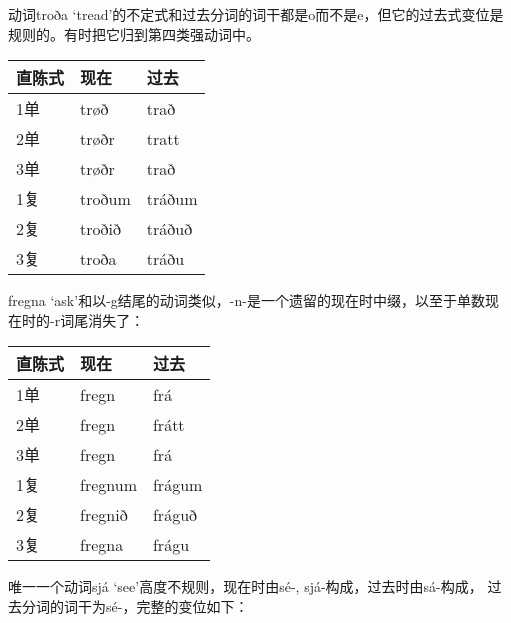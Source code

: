 动词troða
`tread‌'的不定式和过去分词的词干都是o而不是e，但它的过去式变位是规则的。有时把它归到第四类强动词中。

\begin{longtable}{lll}
  \toprule
  直陈式 & 现在   & 过去   \\
  \midrule
  \endhead
  \bottomrule
  \endfoot
  1单    & trøð   & trað   \\
  2单    & trøðr  & tratt  \\
  3单    & trøðr  & trað   \\
  1复    & troðum & tráðum \\
  2复    & troðið & tráðuð \\
  3复    & troða  & tráðu  \\
\end{longtable}

fregna
`ask'和以-g结尾的动词类似，-n-是一个遗留的现在时中缀，以至于单数现在时的-r词尾消失了：

\begin{longtable}{lll}
  \toprule
  直陈式 & 现在    & 过去   \\
  \midrule
  \endhead
  \bottomrule
  \endfoot
  1单    & fregn   & frá    \\
  2单    & fregn   & frátt  \\
  3单    & fregn   & frá    \\
  1复    & fregnum & frágum \\
  2复    & fregnið & fráguð \\
  3复    & fregna  & frágu  \\
\end{longtable}

唯一一个动词sjá `see‌'高度不规则，现在时由sé-, sjá-构成，过去时由sá-构成，
过去分词的词干为sé-，完整的变位如下：

